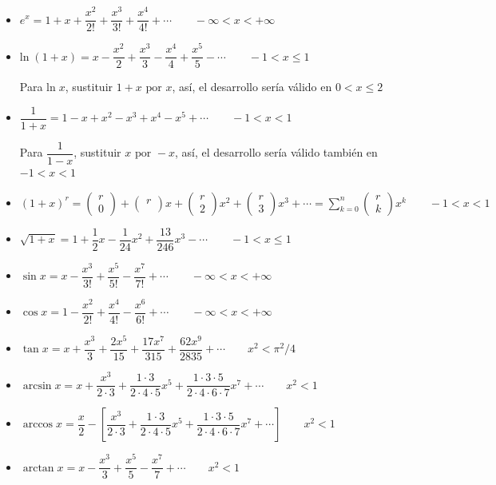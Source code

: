 \begin{itemize}
	\item $e^x=1+x+\dfrac{x^2}{2!}+\dfrac{x^3}{3!}+\dfrac{x^4}{4!}+\cdots \qquad -\infty < x < +\infty$
	\item $\mathrm{ln}\; (1+x)=x-\dfrac{x^2}{2}+\dfrac{x^3}{3}-\dfrac{x^4}{4}+\dfrac{x^5}{5}- \cdots \qquad -1 < x \le 1 $
	
	\textcolor{gris}{\small{Para $\mathrm{ln}\; x$, sustituir $1+x \mbox{ por } x$, así, el desarrollo sería válido en $0<x\le 2$}}
	\item $\dfrac{1}{1+x}=1-x+x^2-x^3+x^4-x^5+\cdots \qquad -1<x<1$
	
	\textcolor{gris}{\small{Para $\dfrac {1}{1-x}$, sustituir $x \mbox{ por } -x$, así, el desarrollo sería válido también en $-1<x< 1$}}
	\item $(1+x)^r=\left( \begin{matrix} r \\ 0 \end{matrix} \right) +\left( \begin{matrix} r \\  \end{matrix} \right) x+\left( \begin{matrix} r \\ 2 \end{matrix} \right) x^2+\left( \begin{matrix} r \\ 3 \end{matrix} \right) x^3+\cdots =\sum _{ k=0 }^{ n }{ \left( \begin{matrix} r \\ k \end{matrix} \right) { x }^{ k } } \qquad -1<x<1$
	
	\item $\sqrt{1+x} = 1 + \dfrac 1 2 x -\dfrac 1 {24} x^2 + \dfrac {13}{246}x^3- \cdots \qquad -1<x\le 1 $
	\item $\sin x = x -\dfrac{x^3}{3!}+\dfrac{x^5}{5!}-\dfrac{x^7}{7!}+\cdots \qquad -\infty < x < +\infty$
	\item $\cos x = 1 -\dfrac{x^2}{2!}+\dfrac{x^4}{4!}-\dfrac{x^6}{6!}+\cdots \qquad -\infty < x < +\infty$
	\item $\tan x= x+ \dfrac{x^3}{3}+\dfrac{2x^5}{15}+\dfrac{17x^7}{315}+\dfrac{62x^9}{2835}+ \cdots \qquad x^2<\pi^2/4$
	\item $\arcsin x =x+\dfrac{x^3}{2 \cdot 3}+\dfrac{1\cdot 3}{2 \cdot 4\cdot 5}x^5+\dfrac{1\cdot 3 \cdot 5}{2\cdot 4 \cdot 6 \cdot 7}x^7+ \cdots \qquad x^2<1$
	\item $\arccos x = \dfrac {x}{2}- \left[ \dfrac{x^3}{2 \cdot 3}+\dfrac{1\cdot 3}{2 \cdot 4\cdot 5}x^5+\dfrac{1\cdot 3 \cdot 5}{2\cdot 4 \cdot 6 \cdot 7}x^7+ \cdots \right] \qquad x^2<1$
	\item $\arctan x=x - \dfrac {x^3}{3} +\dfrac {x^5}{5}-\dfrac {x^7}{7}+\cdots \qquad x^2<1$

	
\end{itemize}
	

